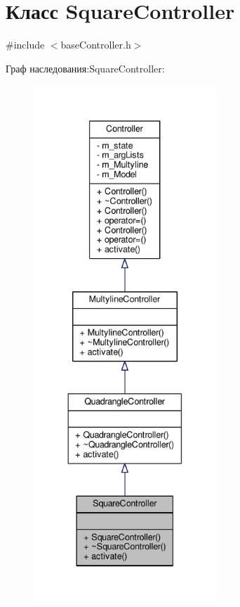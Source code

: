 \hypertarget{class_square_controller}{\section{Класс Square\-Controller}
\label{class_square_controller}
}


{\ttfamily \#include $<$base\-Controller.\-h$>$}



Граф наследования\-:Square\-Controller\-:
\nopagebreak
\begin{figure}[H]
\begin{center}
\leavevmode
\includegraphics[height=550pt]{class_square_controller__inherit__graph}
\end{center}
\end{figure}


